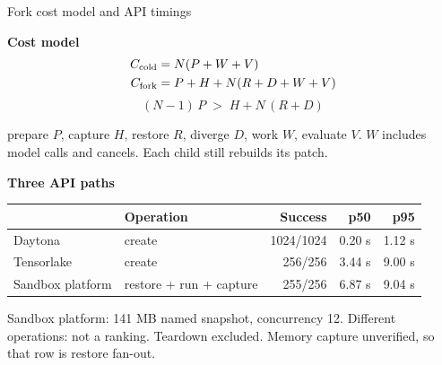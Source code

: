 \begin{frame}[t]{\ev{\tagM\,\tagP}Fork cost model and API timings}
\vspace{0pt}
\noindent\begin{minipage}[t]{.43\textwidth}
\textbf{Cost model} \tagP
\[\begin{aligned}C_{\rm cold}&=N(P+W+V)\\ C_{\rm fork}&=P+H+N(R+D+W+V)\end{aligned}\]
\[(N-1)\,P \;>\; H + N\,(R+D)\]
{\footnotesize prepare $P$, capture $H$, restore $R$, diverge $D$, work $W$, evaluate $V$. $W$ includes model calls and cancels. Each child still rebuilds its patch.\par}
\end{minipage}\hfill
\begin{minipage}[t]{.52\textwidth}
\textbf{Three API paths} \tagM\\[3pt]
{\scriptsize\renewcommand{\arraystretch}{1.1}\setlength{\tabcolsep}{3pt}
\begin{tabularx}{\linewidth}{@{}l Y r r r@{}}
\toprule
& Operation & Success & p50 & p95\\
\midrule
Daytona & create & 1024/1024 & 0.20 s & 1.12 s\\
Tensorlake & create & 256/256 & 3.44 s & 9.00 s\\
Sandbox platform & restore + run + capture & 255/256 & 6.87 s & 9.04 s\\
\bottomrule
\end{tabularx}\par}
\vspace{.1cm}
{\footnotesize\color{Muted}Sandbox platform: 141 MB named snapshot, concurrency 12. Different operations: not a ranking. Teardown excluded. Memory capture unverified, so that row is restore fan-out.\par}
\end{minipage}
\end{frame}
